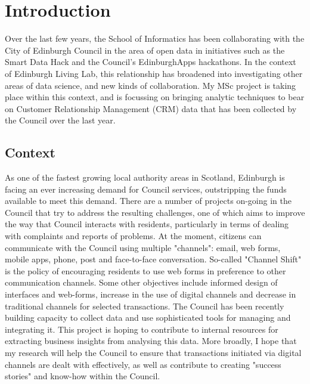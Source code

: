 
\chapter{Introduction}

Over the last few years, the School of Informatics has been collaborating with the City of Edinburgh Council in the area of open data in initiatives such as the Smart Data Hack and the Council's EdinburghApps hackathons. In the context of Edinburgh Living Lab, this relationship has broadened into investigating other areas of data science, and new kinds of collaboration. My MSc project is taking place within this context, and is focussing on bringing analytic techniques to bear on Customer Relationship Management (CRM) data that has been collected by the Council over the last year.

	\section{Context}

As one of the fastest growing local authority areas in Scotland, Edinburgh is facing an ever increasing demand for Council services, outstripping the funds available to meet this demand. There are a number of projects on-going in the Council that try to address the resulting challenges, one of which aims to improve the way that Council interacts with residents, particularly in terms of dealing with complaints and reports of problems. At the moment, citizens can communicate with the Council using multiple "channels": email, web forms, mobile apps, phone, post and face-to-face conversation. So-called "Channel Shift" is the policy of encouraging residents to use web forms in preference to other communication channels. Some other objectives include informed design of interfaces and web-forms, increase in the use of digital channels and decrease in traditional channels for selected transactions. The Council has been recently building capacity to collect data and use sophisticated tools for managing and integrating it. This project is hoping to contribute to internal resources for extracting business insights from analysing this data. More broadly, I hope that my research will help the Council to ensure that transactions initiated via digital channels are dealt with effectively, as well as contribute to creating "success stories" and know-how within the Council.

